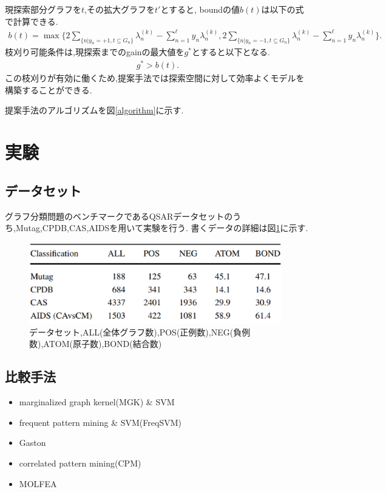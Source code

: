 \documentclass{zasshi-prml3}
\theoremstyle{definition}
\begin{document}
現探索部分グラフを$t$,その拡大グラフを$t'$とすると,
boundの値$b(t)$は以下の式で計算できる.
\begin{align}
	\label{eq:bound}
	b(t) = \max\{2 \sum_{\{n|y_{n}=+1, t \subseteq G_{n}\}} \lambda_{n}^{(k)} - \sum_{n=1}^{\ell} y_{n} \lambda_{n}^{(k)},	2 \sum_{\{n|y_{n}=-1, t \subseteq G_{n}\}} \lambda_{n}^{(k)} - \sum_{n=1}^{\ell} y_{n} \lambda_{n}^{(k)}\}.
\end{align}
枝刈り可能条件は,現探索までのgainの最大値を$g^{*}$とすると以下となる.
\begin{align}
	\label{eq:prune}
	g^{*} > b(t).
\end{align}
この枝刈りが有効に働くため,提案手法では探索空間に対して効率よくモデルを構築することができる.

提案手法のアルゴリズムを図\ref{algorithm}に示す.

\section{実験}
\subsection{データセット}
グラフ分類問題のベンチマークであるQSARデータセットのうち,Mutag,CPDB,CAS,AIDSを用いて実験を行う.
書くデータの詳細は図\ref{datasets}に示す.
\begin{figure}[t]
	\centering
	\includegraphics[width=110mm]{figure/datasets.png}
	\caption{データセット,ALL(全体グラフ数),POS(正例数),NEG(負例数),ATOM(原子数),BOND(結合数)}
	\label{datasets}
\end{figure}

\subsection{比較手法}
\begin{itemize}
	\item marginalized graph kernel(MGK) \& SVM
	\item frequent pattern mining \& SVM(FreqSVM)
	\item Gaston
	\item correlated pattern mining(CPM)
	\item MOLFEA
\end{itemize}
\end{document}
